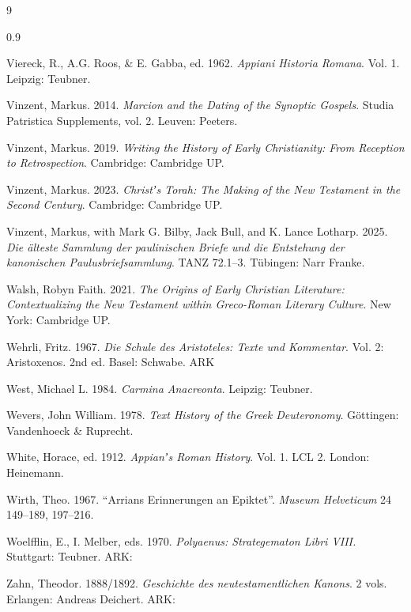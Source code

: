 \begin{thebibliography}{9}
\begin{spacing}{0.9}
\begin{small}
Viereck, R., A.G. Roos, \& E. Gabba, ed. 1962. %
\textit{Appiani Historia Romana}. Vol. 1. %
Leipzig: Teubner. %

Vinzent, Markus. 2014. %
\textit{Marcion and the Dating of the Synoptic Gospels}. %
Studia Patristica Supplements, vol. 2. %
Leuven: Peeters. %

Vinzent, Markus. 2019. %
\textit{Writing the History of Early Christianity: %
From Reception to Retrospection}. %
Cambridge: Cambridge UP. %

Vinzent, Markus. 2023. %
\textit{Christʼs Torah: The Making of the New Testament in the Second Century}. %
Cambridge: Cambridge UP.

Vinzent, Markus, with Mark G. Bilby, Jack Bull, and K. Lance Lotharp. 2025. %
\textit{Die älteste Sammlung der paulinischen Briefe und die Entstehung der kanonischen Paulusbriefsammlung}. %
TANZ 72.1--3. Tübingen: Narr Franke. %

Walsh, Robyn Faith. 2021. %
\textit{The Origins of Early Christian Literature: %
Contextualizing the New Testament within Greco-Roman Literary Culture}. %
New York: Cambridge UP. %

Wehrli, Fritz. 1967. %
\textit{Die Schule des Aristoteles: Texte und Kommentar}. %
Vol. 2: Aristoxenos. 2nd ed. %
Basel: Schwabe. %
ARK 

West, Michael L. 1984. %
\textit{Carmina Anacreonta}. %
Leipzig: Teubner. %

Wevers, John William. 1978. %
\textit{Text History of the Greek Deuteronomy}. %
Göttingen: Vandenhoeck \& Ruprecht. %

White, Horace, ed. 1912. %
\textit{Appianʼs Roman History}. Vol. 1. %
LCL 2. London: Heinemann. %

Wirth, Theo. 1967. %
“Arrians Erinnerungen an Epiktet”. %
\textit{Museum Helveticum} 24 149--189, 197--216.

Woelfflin, E., I. Melber, eds. 1970. %
\textit{Polyaenus: Strategematon Libri VIII.} %
Stuttgart: Teubner. %
ARK: 

Zahn, Theodor. 1888/1892. %
\textit{Geschichte des neutestamentlichen Kanons}. 2 vols. %
Erlangen: Andreas Deichert. %
ARK: 

\end{small}
\end{spacing}
\end{thebibliography}

